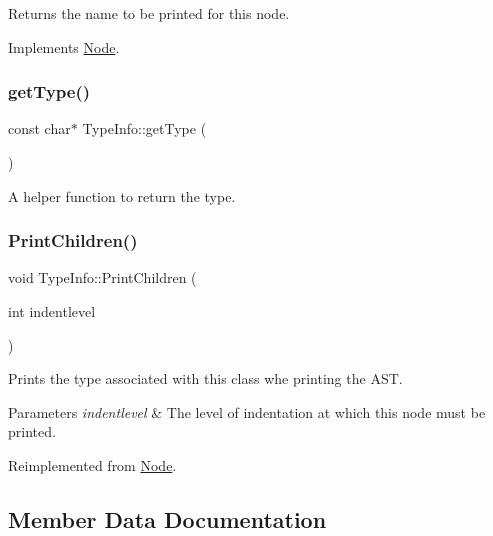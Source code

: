 Returns the name to be printed for this node. 

Implements \hyperlink{class_node_a56e29657306ffb004d69c6929ae44269}{Node}.

\mbox{\label{class_type_info_a53b947997bf124e64ab5a18d16388558}} 
\subsubsection{\texorpdfstring{get\+Type()}{getType()}}
{\footnotesize\ttfamily const char$\ast$ Type\+Info\+::get\+Type (\begin{DoxyParamCaption}{ }\end{DoxyParamCaption})\hspace{0.3cm}{\ttfamily [inline]}}

A helper function to return the type. \mbox{\label{class_type_info_a9b4bc126eb0ee406f1d515e166256627}} 
\subsubsection{\texorpdfstring{Print\+Children()}{PrintChildren()}}
{\footnotesize\ttfamily void Type\+Info\+::\+Print\+Children (\begin{DoxyParamCaption}\item[{int}]{indentlevel }\end{DoxyParamCaption})\hspace{0.3cm}{\ttfamily [virtual]}}

Prints the type associated with this class whe printing the A\+ST. 
\begin{DoxyParams}{Parameters}
{\em indentlevel} & The level of indentation at which this node must be printed. \\
\hline
\end{DoxyParams}


Reimplemented from \hyperlink{class_node_a3e67ec8d22182b721717af14fe0c3000}{Node}.



\subsection{Member Data Documentation}
\mbox{\label{class_type_info_a07af85dc9ce62676640cf960cac376a7}} 
